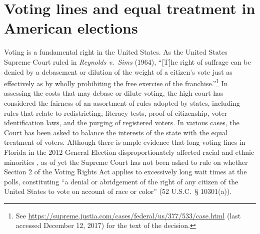 \documentclass[12pt,titlepage]{article}
\begin{document}
\section*{Voting lines and equal treatment in American elections}

Voting is a fundamental right in the United States. As the United
States Supreme Court ruled in \emph{Reynolds v.\ Sims} (1964), ``[T]he
right of suffrage can be denied by a debasement or dilution of the
weight of a citizen's vote just as effectively as by wholly
prohibiting the free exercise of the franchise.''\footnote{See
  \url{https://supreme.justia.com/cases/federal/us/377/533/case.html}
  (last accessed December 12, 2017) for the text of the decision.}  In
assessing the costs that may debase or dilute voting, the high court
has considered the fairness of an assortment of rules adopted by
states, including rules that relate to redistricting, literacy tests,
proof of citizenship, voter identification laws, and the purging of
registered voters. In various cases, the Court has been asked to
balance the interests of the state with the equal treatment of
voters. Although there is ample evidence that long voting lines in
Florida in the 2012 General Election disproportionately affected
racial and ethnic minorities \citep{herron_smith2014}, as of yet the
Supreme Court has not been asked to rule on whether Section 2 of the
Voting Rights Act applies to excessively long wait times at the polls,
constituting ``a denial or abridgement of the right of any citizen of
the United States to vote on account of race or color'' (52 U.S.C.\ \S
10301(a)).
\end{document}
